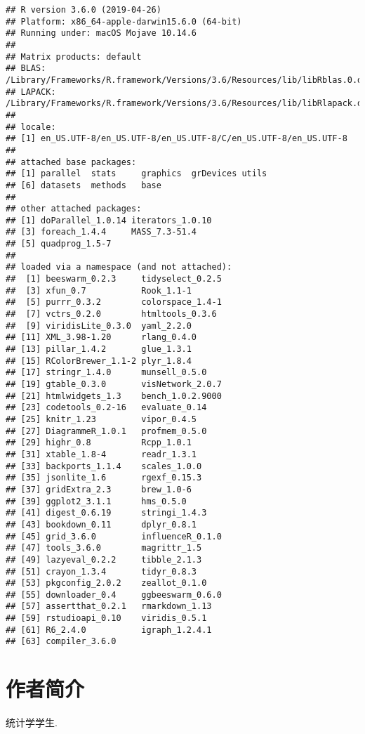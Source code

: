\documentclass[]{ctexbook}
\begin{document}
\begin{verbatim}
## R version 3.6.0 (2019-04-26)
## Platform: x86_64-apple-darwin15.6.0 (64-bit)
## Running under: macOS Mojave 10.14.6
## 
## Matrix products: default
## BLAS:   /Library/Frameworks/R.framework/Versions/3.6/Resources/lib/libRblas.0.dylib
## LAPACK: /Library/Frameworks/R.framework/Versions/3.6/Resources/lib/libRlapack.dylib
## 
## locale:
## [1] en_US.UTF-8/en_US.UTF-8/en_US.UTF-8/C/en_US.UTF-8/en_US.UTF-8
## 
## attached base packages:
## [1] parallel  stats     graphics  grDevices utils    
## [6] datasets  methods   base     
## 
## other attached packages:
## [1] doParallel_1.0.14 iterators_1.0.10 
## [3] foreach_1.4.4     MASS_7.3-51.4    
## [5] quadprog_1.5-7   
## 
## loaded via a namespace (and not attached):
##  [1] beeswarm_0.2.3     tidyselect_0.2.5  
##  [3] xfun_0.7           Rook_1.1-1        
##  [5] purrr_0.3.2        colorspace_1.4-1  
##  [7] vctrs_0.2.0        htmltools_0.3.6   
##  [9] viridisLite_0.3.0  yaml_2.2.0        
## [11] XML_3.98-1.20      rlang_0.4.0       
## [13] pillar_1.4.2       glue_1.3.1        
## [15] RColorBrewer_1.1-2 plyr_1.8.4        
## [17] stringr_1.4.0      munsell_0.5.0     
## [19] gtable_0.3.0       visNetwork_2.0.7  
## [21] htmlwidgets_1.3    bench_1.0.2.9000  
## [23] codetools_0.2-16   evaluate_0.14     
## [25] knitr_1.23         vipor_0.4.5       
## [27] DiagrammeR_1.0.1   profmem_0.5.0     
## [29] highr_0.8          Rcpp_1.0.1        
## [31] xtable_1.8-4       readr_1.3.1       
## [33] backports_1.1.4    scales_1.0.0      
## [35] jsonlite_1.6       rgexf_0.15.3      
## [37] gridExtra_2.3      brew_1.0-6        
## [39] ggplot2_3.1.1      hms_0.5.0         
## [41] digest_0.6.19      stringi_1.4.3     
## [43] bookdown_0.11      dplyr_0.8.1       
## [45] grid_3.6.0         influenceR_0.1.0  
## [47] tools_3.6.0        magrittr_1.5      
## [49] lazyeval_0.2.2     tibble_2.1.3      
## [51] crayon_1.3.4       tidyr_0.8.3       
## [53] pkgconfig_2.0.2    zeallot_0.1.0     
## [55] downloader_0.4     ggbeeswarm_0.6.0  
## [57] assertthat_0.2.1   rmarkdown_1.13    
## [59] rstudioapi_0.10    viridis_0.5.1     
## [61] R6_2.4.0           igraph_1.2.4.1    
## [63] compiler_3.6.0
\end{verbatim}

\hypertarget{author}{%
\chapter*{作者简介}\label{author}}


统计学学生.
\end{document}
